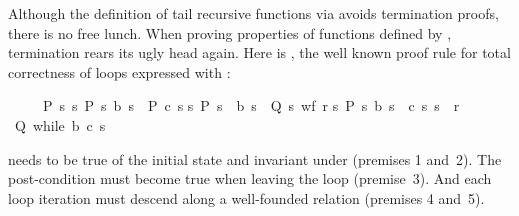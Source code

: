 \begin{isabellebody}
\begin{isamarkuptext}
Although the definition of tail recursive functions via  avoids
termination proofs, there is no free lunch. When proving properties of
functions defined by , termination rears its ugly head
again. Here is , the well known proof rule for total
correctness of loops expressed with :
\begin{isabelle}%
\ \ \ \ \ {\isasymlbrakk}P\ s{\isacharsemicolon}\ {\isasymAnd}s{\isachardot}\ {\isasymlbrakk}P\ s{\isacharsemicolon}\ b\ s{\isasymrbrakk}\ {\isasymLongrightarrow}\ P\ {\isacharparenleft}c\ s{\isacharparenright}{\isacharsemicolon}\isanewline
\isaindent{\ \ \ \ \ \ }{\isasymAnd}s{\isachardot}\ {\isasymlbrakk}P\ s{\isacharsemicolon}\ {\isasymnot}\ b\ s{\isasymrbrakk}\ {\isasymLongrightarrow}\ Q\ s{\isacharsemicolon}\ wf\ r{\isacharsemicolon}\isanewline
\isaindent{\ \ \ \ \ \ }{\isasymAnd}s{\isachardot}\ {\isasymlbrakk}P\ s{\isacharsemicolon}\ b\ s{\isasymrbrakk}\ {\isasymLongrightarrow}\ {\isacharparenleft}c\ s{\isacharcomma}\ s{\isacharparenright}\ {\isasymin}\ r{\isasymrbrakk}\isanewline
\isaindent{\ \ \ \ \ }{\isasymLongrightarrow}\ Q\ {\isacharparenleft}while\ b\ c\ s{\isacharparenright}%
\end{isabelle}  needs to be true of
the initial state  and invariant under  (premises 1
and~2). The post-condition  must become true when leaving the loop
(premise~3). And each loop iteration must descend along a well-founded
relation  (premises 4 and~5).


\end{isamarkuptext}
\end{isabellebody}
